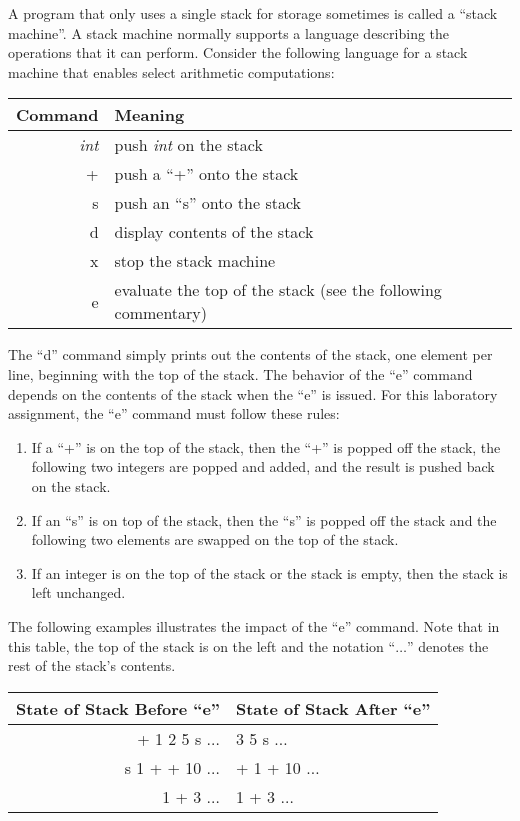   A program that only uses a single stack for storage sometimes is called a ``stack machine''. A stack machine normally 
  supports a language describing the operations that it can perform. Consider the following language for a stack machine
  that enables select arithmetic computations:

\begin{tabular}{r | l}
Command & Meaning \\ \hline
\emph{int} & push \emph{int} on the stack \\
+ & push a ``+'' onto the stack \\
s & push an ``s'' onto the stack \\
d & display contents of the stack \\
x & stop the stack machine \\
e & evaluate the top of the stack (see the following commentary) \\
\end{tabular}

  The ``d'' command simply prints out the contents of the stack, one element per line, beginning with the top of the
  stack. The behavior of the ``e'' command depends on the contents of the stack when the ``e'' is issued. For this
  laboratory assignment, the ``e'' command must follow these rules:

\begin{enumerate}

  \item If a ``+'' is on the top of the stack, then the ``+'' is popped off the stack, the following two integers are
    popped and added, and the result is pushed back on the stack.

  \item If an ``s'' is on top of the stack, then the ``s'' is popped off the stack and the following two elements are
    swapped on the top of the stack.

  \item If an integer is on the top of the stack or the stack is empty, then the stack is left unchanged.

\end{enumerate}

The following examples illustrates the impact of the ``e'' command. Note that in this table, the top of the stack is on
the left and the notation ``$\ldots$'' denotes the rest of the stack's contents.

\begin{tabular}{r | l}
State of Stack Before ``e'' & State of Stack After ``e'' \\ \hline
+ 1 2 5 s $\ldots$  & 3 5 s $\ldots$ \\
s 1 + + 10 $\ldots$ & + 1 + 10 $\ldots$ \\
1 + 3 $\ldots$      & 1 + 3 $\ldots$ \\
\end{tabular}

